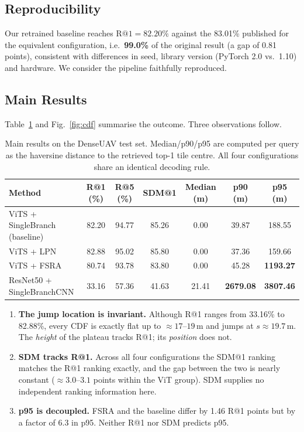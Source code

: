 \documentclass[journal]{IEEEtran}
\begin{document}
\subsection{Reproducibility}
Our retrained baseline reaches $\text{R@1}=82.20\%$ against the 83.01\% published for the
equivalent configuration, i.e.\ \textbf{99.0\%} of the original result (a gap of 0.81
points), consistent with differences in seed, library version (PyTorch 2.0 vs.\ 1.10) and
hardware. We consider the pipeline faithfully reproduced.

\subsection{Main Results}
Table~\ref{tab:main} and Fig.~\ref{fig:cdf} summarise the outcome. Three observations
follow.

\begin{table}[!t]
\centering
\caption{Main results on the DenseUAV test set. Median/p90/p95 are computed per query as
the haversine distance to the retrieved top-1 tile centre. All four configurations share
an identical decoding rule.}
\label{tab:main}
\begin{tabular}{lcccccc}
\toprule
Method & R@1 (\%) & R@5 (\%) & SDM@1 & Median (m) & p90 (m) & p95 (m) \\
\midrule
ViTS + SingleBranch (baseline) & 82.20 & 94.77 & 85.26 & 0.00 & 39.87 & 188.55 \\
ViTS + LPN                     & 82.88 & 95.02 & 85.80 & 0.00 & 37.36 & 159.66 \\
ViTS + FSRA                    & 80.74 & 93.78 & 83.80 & 0.00 & 45.28 & \textbf{1193.27} \\
ResNet50 + SingleBranchCNN     & 33.16 & 57.36 & 41.63 & 21.41 & \textbf{2679.08} & \textbf{3807.46} \\
\bottomrule
\end{tabular}
\end{table}

\begin{enumerate}
\item \textbf{The jump location is invariant.} Although R@1 ranges from 33.16\% to
82.88\%, every CDF is exactly flat up to $\approx17$--$19$\,m and jumps at
$s \approx 19.7$\,m. The \emph{height} of the plateau tracks R@1; its \emph{position}
does not.
\item \textbf{SDM tracks R@1.} Across all four configurations the SDM@1 ranking matches
the R@1 ranking exactly, and the gap between the two is nearly constant
($\approx 3.0$--$3.1$ points within the ViT group). SDM supplies no independent ranking
information here.
\item \textbf{p95 is decoupled.} FSRA and the baseline differ by 1.46 R@1 points but by a
factor of 6.3 in p95. Neither R@1 nor SDM predicts p95.
\end{enumerate}
\end{document}
